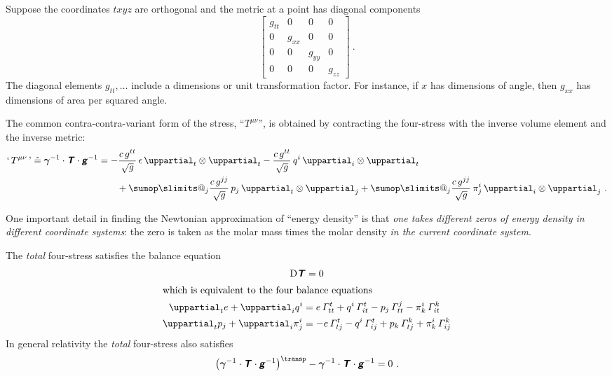 \documentclass[\ifafour a4paper,12pt,\else a5paper,10pt,\fi%
onecolumn,oneside,article,%
british%
]{memoir}
\makeatletter
\theoremstyle{remark}
\theoremstyle{innote}
\def\sum{\DOTSI\sumop\slimits@}
\newcommand*{\mathte}[1]{\textbf{\textit{\textsf{#1}}}}
\newcommand*{\de}{\uppartial}%
\newcommand*{\Di}{\mathrm{D}}%
\newcommand*{\corr}{\mathrel{\hat{=}}}%
\renewcommand*{\|}[1][]{\nonscript\:#1\vert\nonscript\:\mathopen{}}
\newcommand*{\T}{^\transp}%
\newcommand*{\se}[1]{\de_{#1}}
\newcommand*{\yg}{\mathte{g}}
\newcommand*{\dg}{\sqrt{g}}
\newcommand*{\vi}{\bm{\gamma}^{-1}}
\newcommand*{\yT}{\mathte{T}}
\makeatother
\begin{document}
Suppose the coordinates $txyz$ are orthogonal and the metric at a point has diagonal components
\begin{equation}
  \label{eq:metric_orthonormal}
  \begin{bmatrix}
    g_{tt}&0&0&0\\0&g_{xx}&0&0\\0&0&g_{yy}&0\\0&0&0&g_{zz}
  \end{bmatrix} \ .
\end{equation}
The diagonal elements $g_{tt}, \dotsc$ include a dimensions or unit transformation factor. For instance, if $x$ has dimensions of angle, then $g_{xx}$ has dimensions of area per squared angle.

The common contra-contra-variant form of the stress, \enquote{$T^{\mu\nu}$}, is obtained by contracting the four-stress with the inverse volume element and the inverse metric:
\begin{equation}
  \label{eq:contr_metric_T}
  \begin{split}
\text{`\,}T^{\mu\nu}\text{\,'} \corr  \vi \cdot \yT \cdot \yg^{-1} &=
    -\frac{c\,g^{tt}}{\dg}\,\epsilon\, \se{t}\otimes\se{t}
    -\frac{c\,g^{tt}}{\dg}\,q^{i}\, \se{i}\otimes\se{t} \\
    &\qquad{}+\sum_{j}\frac{c\,g^{jj}}{\dg}\,p_{j}\, \se{t}\otimes\se{j}
    +\sum_{j}\frac{c\,g^{jj}}{\dg}\,\pi^{i}_{j}\, \se{i}\otimes\se{j}
    \ .
  \end{split}
\end{equation}

\medskip

One important detail in finding the Newtonian approximation of \enquote{energy density} is that \emph{one takes different zeros of energy density in different coordinate systems}: the zero is taken as the molar mass times the molar density \emph{in the current coordinate system}.


The \emph{total} four-stress satisfies the balance equation
\begin{gather}
  \label{eq:4stress_balance}
    \Di\yT = 0
    \\
    \shortintertext{which is equivalent to the four balance equations}
  \label{eq:4stress_balance_comps}
    \begin{aligned}
  \de_{t}e + \de_{i}q^{i} &=
  e\,\varGamma^{t}_{tt}
  +q^{i}\, \varGamma^{t}_{it}
  -p_{j}\, \varGamma^{j}_{tt}
  -\pi^{i}_{k}\, \varGamma^{k}_{it}
  \\
  \de_{t}p_{j} +  \de_{i}\pi^{i}_{j} &=
  -e\,\varGamma^{t}_{tj}
  -q^{i}\,\varGamma^{t}_{ij}
  +p_{k}\,\varGamma^{k}_{tj}
  +\pi^{i}_{k}\,\varGamma^{k}_{ij}
\end{aligned}
\end{gather}
In general relativity the \emph{total} four-stress also satisfies
\begin{equation}
  \label{eq:4stress_symm}
  \bigl(\vi\cdot\yT\cdot\yg^{-1}\bigr)\T - \vi\cdot\yT\cdot\yg^{-1} = 0 \ .
\end{equation}
\end{document}
